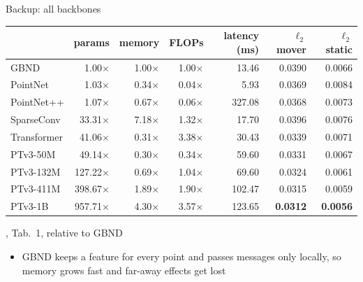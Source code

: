 \documentclass[aspectratio=169,12pt]{beamer}
\newcommand{\src}[1]{{\scriptsize\color{mute}\citep{#1}}}
\newcommand{\credit}[1]{\par\hfill{\tiny\color{mute}\citet{huang2026pointworld}, #1}\par}
\newcommand{\pw}[1]{{\color{pw}#1}}
\newenvironment{notes}[1][\linewidth]
  {\begin{minipage}{#1}\footnotesize\begin{itemize}\setlength{\itemsep}{2pt}}
  {\end{itemize}\end{minipage}}
\begin{document}
\begin{frame}{Backup: all backbones}
  \centering\small
  \setlength{\tabcolsep}{5pt}
  \begin{tabular}{@{}lrrrrrr@{}}
    \toprule
    & params & memory & FLOPs & latency (ms) & $\ell_2$ mover & $\ell_2$ static \\
    \midrule
    GBND \src{ai2025review} & 1.00$\times$ & 1.00$\times$ & 1.00$\times$ & 13.46 & 0.0390 & 0.0066 \\
    PointNet & 1.03$\times$ & 0.34$\times$ & 0.04$\times$ & 5.93 & 0.0369 & 0.0084 \\
    PointNet++ & 1.07$\times$ & 0.67$\times$ & 0.06$\times$ & 327.08 & 0.0368 & 0.0073 \\
    SparseConv & 33.31$\times$ & 7.18$\times$ & 1.32$\times$ & 17.70 & 0.0396 & 0.0076 \\
    Transformer & 41.06$\times$ & 0.31$\times$ & 3.38$\times$ & 30.43 & 0.0339 & 0.0071 \\
    \pw{PTv3-50M} & 49.14$\times$ & 0.30$\times$ & 0.34$\times$ & 59.60 & 0.0331 & 0.0067 \\
    \pw{PTv3-132M} & 127.22$\times$ & 0.69$\times$ & 1.04$\times$ & 69.60 & 0.0324 & 0.0061 \\
    \pw{PTv3-411M} & 398.67$\times$ & 1.89$\times$ & 1.90$\times$ & 102.47 & 0.0315 & 0.0059 \\
    \pw{PTv3-1B} & 957.71$\times$ & 4.30$\times$ & 3.57$\times$ & 123.65 & \textbf{0.0312}
      & \textbf{0.0056} \\
    \bottomrule
  \end{tabular}
  \credit{Tab.~1, relative to GBND}
  \vspace{4pt}
  \begin{notes}[0.86\linewidth]
    \item GBND keeps a feature for every point and passes messages only locally, so memory
      grows fast and far-away effects get lost
  \end{notes}
\end{frame}
\end{document}
